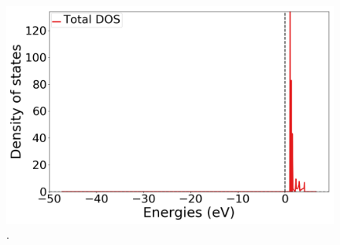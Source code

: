 \documentclass{article}
\begin{document}

  \begin{figure}[H]
      \centering
      \includegraphics[width = 11cm]{../fig/Y_k4_TDOS_1.png}
      \caption{. }
      \label{fig:Y_k4_TDOS_1.png}
  \end{figure}
\end{document}
